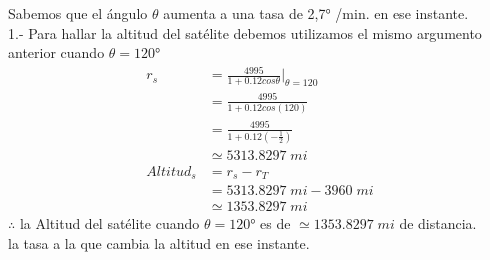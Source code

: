 Sabemos que el ángulo $\theta$ aumenta a una tasa de 2,7° /min. en ese instante.\\
1.- Para hallar la altitud del satélite debemos utilizamos el mismo argumento anterior cuando $\theta=120$°
\begin{align*}
	r_{s}     & =\frac{4995}{1+0.12cos\theta} \bigg|_{\theta=120} \\
	          & =\frac{4995}{1+0.12cos(120)}                      \\
	          & =\frac{4995}{1+0.12(-\frac{1}{2})}                \\
	          & \simeq 5313.8297 \;mi                             \\
	Altitud_s & = r_s-r_T                                         \\
	          & = 5313.8297 \;mi-3960\;mi                         \\
	          & \simeq 1353.8297\;mi
\end{align*}
$\therefore$ la Altitud del satélite cuando $\theta=120$° es de $\simeq 1353.8297\;mi$ de distancia.\\
la tasa a la que cambia la altitud en ese instante.

